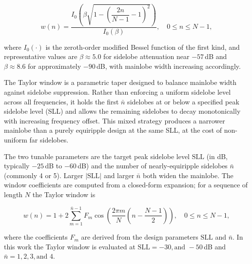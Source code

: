 \begin{equation}
    w(n) = \frac{I_0\!\left(\beta\sqrt{1 - \left(\dfrac{2n}{N-1} - 1\right)^{\!2}}\right)}
                {I_0(\beta)},
    \quad 0 \le n \le N-1,
    \label{eq:kaiser}
\end{equation}

\noindent where $I_0(\cdot)$ is the zeroth-order modified Bessel function of the
first kind, and representative values are $\beta \approx 5.0$ for sidelobe
attenuation near $-57$\,dB and $\beta \approx 8.6$ for approximately $-90$\,dB,
with mainlobe width increasing accordingly.

The Taylor window is a parametric taper designed to balance mainlobe width against
sidelobe suppression. Rather than enforcing a uniform sidelobe level across all
frequencies, it holds the first $\bar{n}$ sidelobes at or below a specified peak
sidelobe level (SLL) and allows the remaining sidelobes to decay monotonically
with increasing frequency offset. This mixed strategy produces a narrower mainlobe
than a purely equiripple design at the same SLL, at the cost of non-uniform far
sidelobes.

The two tunable parameters are the target peak sidelobe level $\text{SLL}$ (in dB,
typically $-25$\,dB to $-60$\,dB) and the number of nearly-equiripple sidelobes
$\bar{n}$ (commonly 4 or 5). Larger $|\text{SLL}|$ and larger $\bar{n}$ both
widen the mainlobe. The window coefficients are computed from a closed-form
expansion; for a sequence of length $N$ the Taylor window is

\begin{equation}
    w(n) = 1 + 2\sum_{m=1}^{\bar{n}-1} F_m \cos\!\left(\frac{2\pi m}{N}\!\left(n - \frac{N-1}{2}\right)\right),
    \quad 0 \le n \le N-1,
    \label{eq:taylor}
\end{equation}

\noindent where the coefficients $F_m$ are derived from the design parameters $\text{SLL}$ and
$\bar{n}$. In this work the Taylor window is
evaluated at $\text{SLL} = -30, \text{and } -50$\,dB and $\bar{n} = 1,2,3, 
\text{and } 4$.


